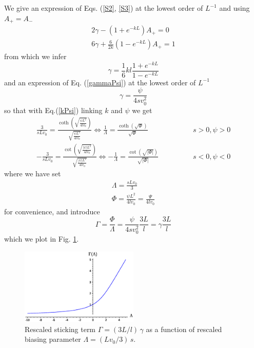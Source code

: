 \documentclass[pre,aps,superscriptaddress,nofootinbib]{revtex4}
\begin{document}
We give an expression of Eqs. (\ref{S2}, \ref{S3}) at the lowest order of $L^{-1}$ and using $A_+ = A_-$
\begin{eqnarray}
2 \gamma - (1 + e^{-kL}) A_+ = 0\\
6 \gamma + \frac{6}{2k} (1 - e^{-kL}) A_+ = 1
\end{eqnarray}
from which we infer
\begin{equation}
\gamma = \frac{1}{6} k l \frac{1 + e^{-kL}}{1 - e^{-kL}}
\end{equation}
and an expression of Eq. (\ref{gammaPsi}) at the lowest order of $L^{-1}$
\begin{equation}
\gamma = \frac{\psi}{4 s v_0^2}
\end{equation}
so that with Eq.(\ref{kPsi}) linking $k$ and $\psi$ we get
\begin{eqnarray}
\frac{3}{s L v_0} = \frac{\coth\left(\sqrt{\frac{\psi L^2}{4 l v_0}}\right)}{\sqrt{\frac{\psi L^2}{4 l v_0}}} \Leftrightarrow \frac{1}{\Lambda} = \frac{\coth\left(\sqrt{\Phi}\right)}{\sqrt{\Phi}} &\qquad\qquad s > 0, \psi > 0\\
- \frac{3}{s L v_0} = \frac{\cot\left(\sqrt{\frac{|\psi| L^2}{4 l v_0}}\right)}{\sqrt{\frac{|\psi| L^2}{4 l v_0}}} \Leftrightarrow - \frac{1}{\Lambda} = \frac{\cot\left(\sqrt{|\Phi|}\right)}{\sqrt{|\Phi|}} &\qquad\qquad s < 0, \psi < 0
\end{eqnarray}
where we have set
\begin{eqnarray}
\Lambda = \frac{s L v_0}{3}\\
\Phi = \frac{\psi L^2}{4 l v_0} = \frac{\Psi}{4 l v_0}
\end{eqnarray}
for convenience, and introduce
\begin{equation}
\Gamma = \frac{\Phi}{\Lambda} = \frac{\psi}{4 s v_0^2} \frac{3 L}{l} = \gamma \frac{3 L}{l}
\end{equation}
which we plot in Fig. \ref{Gamma}.

\begin{figure}[H]
\centering
\includegraphics[width=0.5\textwidth]{gamma.eps}
\caption{Rescaled sticking term $\Gamma = (3L/l) \, \gamma$ as a function of rescaled biasing parameter $\Lambda = (L v_0/3) \, s$.}
\label{Gamma}
\end{figure}



{\renewcommand{\bibname}{References}}
\end{document}
